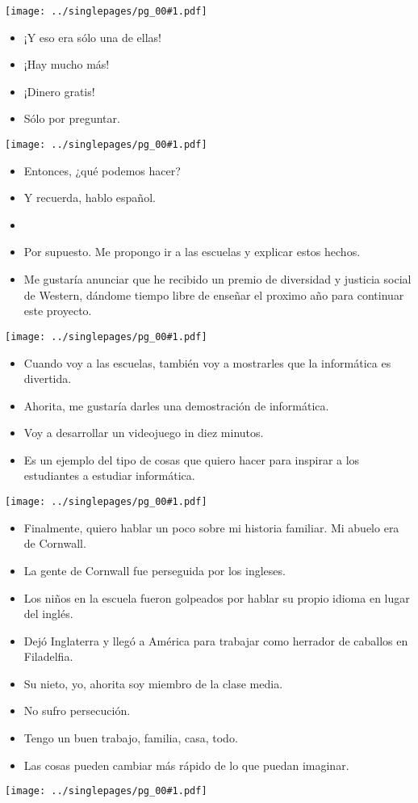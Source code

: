 \documentclass[12pt]{article}
\newcommand{\bi}{\begin{itemize}}
\newcommand{\ei}{\end{itemize}}
\newcommand{\cue}{\mbox{}
  \fbox{\sf Next slide}
}
\newcommand{\fig}[1]{
  \newpage  
  \begin{center}
    \texttt{[image: ../singlepages/pg\_00\#1.pdf]}
  \end{center}
  
}
\begin{document}
\fig{18}

\bi
\item
  ¡Y eso era sólo una de ellas!
\item
  ¡Hay mucho más!
\item
  ¡Dinero gratis!
\item
  Sólo por preguntar.
  \ei
  
\fig{20}

\bi
\item
Entonces, ¿qué podemos hacer?
\item
Y recuerda, hablo español.
\item \cue
\item Por supuesto.  Me propongo ir a las escuelas y explicar estos hechos. 
\item
Me gustaría anunciar que he recibido un premio de diversidad y
justicia social de Western, dándome tiempo libre de enseñar el proximo
año para continuar este proyecto.
\ei

\fig{21}
\bi
\item Cuando voy a las escuelas, también voy a mostrarles que la
  informática es divertida.
\item
Ahorita, me gustaría darles una demostración de informática.
\item
Voy a desarrollar un videojuego in diez minutos.
\item
Es un ejemplo del tipo de cosas que quiero hacer para inspirar a los
estudiantes a estudiar informática.
\ei

\fig{22}
\bi
\item
Finalmente, quiero hablar un poco sobre mi historia familiar.  Mi
abuelo era de Cornwall.
\item
  La gente de Cornwall fue perseguida por los
  ingleses.
\item Los niños en la escuela fueron golpeados por hablar su
  propio idioma en lugar del inglés.
\item
  Dejó Inglaterra y llegó a América
  para trabajar como herrador de caballos en Filadelfia.
\item
  Su nieto, yo,
  ahorita soy miembro de la clase media.
\item
  No sufro persecución.
\item Tengo
  un buen trabajo, familia, casa, todo.
\item
  Las cosas pueden cambiar más
rápido de lo que puedan imaginar.
\ei

\fig{23}
\end{document}
